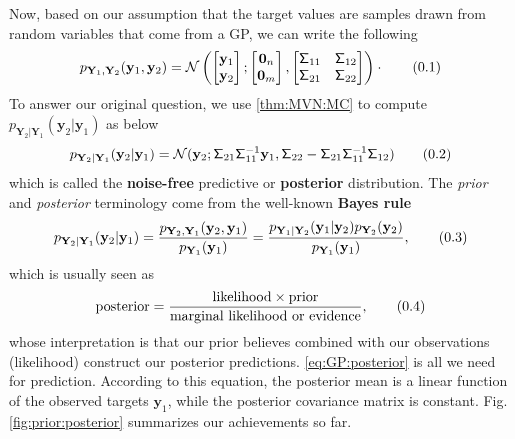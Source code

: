 \documentclass[10pt]{article}
\theoremstyle{definition}
\newcommand\eqnum{\addtocounter{equation}{1}\tag{\arabic{section}.\arabic{equation}}}
\begin{document}
Now, based on our assumption that the target values are samples drawn from random variables that come from a GP, we can write the following
\begin{equation*}
p_{\mathbf{Y}_{1}, \mathbf{Y}_{2}}(\mathbf{y}_{1}, \mathbf{y}_{2}) =
\mathcal{N} \left(
\begin{bmatrix}
\mathbf{y}_1 \\
\mathbf{y}_2
\end{bmatrix} ;
\begin{bmatrix}
\mathbf{0}_n \\
\mathbf{0}_m
\end{bmatrix} ,
\begin{bmatrix}
\mathsf{\Sigma}_{11} & \mathsf{\Sigma}_{12} \\
\mathsf{\Sigma}_{21} & \mathsf{\Sigma}_{22} 
\end{bmatrix}
\right) \cdot
\eqnum
\label{eq:GP:joint}
\end{equation*}
To answer our original question, we use \cref{thm:MVN:MC} to compute $p_{\mathbf{Y}_2|\mathbf{Y}_1}(\mathbf{y}_2|\mathbf{y}_1)$ as below
\begin{equation*}
p_{\mathbf{Y}_2|\mathbf{Y}_1}(\mathbf{y}_2|\mathbf{y}_1) = 
\mathcal{N}(\mathbf{y}_2;\mathsf{\Sigma}_{21}\mathsf{\Sigma}_{11}^{-1}\mathbf{y}_1, \mathsf{\Sigma}_{22} - 
\mathsf{\Sigma}_{21} \mathsf{\Sigma}_{11}^{-1} \mathsf{\Sigma}_{12})
\eqnum
\label{eq:GP:posterior}
\end{equation*}
which is called the \textbf{noise-free} predictive or \textbf{posterior} distribution.  The \textit{prior} and \textit{posterior} terminology come from the well-known \textbf{Bayes rule}
\begin{equation*}
p_{\mathbf{Y}_2|\mathbf{Y}_1}(\mathbf{y}_2|\mathbf{y}_1) =
\frac{p_{\mathbf{Y}_2,\mathbf{Y}_1}(\mathbf{y}_2,\mathbf{y}_1)}{p_{\mathbf{Y}_1}(\mathbf{y}_1)} = 
\frac{p_{\mathbf{Y}_1|\mathbf{Y}_2}(\mathbf{y}_1|\mathbf{y}_2)p_{\mathbf{Y}_2}(\mathbf{y}_2)}{p_{\mathbf{Y}_1}(\mathbf{y}_1)},
\eqnum
\end{equation*}
which is usually seen as
\begin{equation*}
\text{posterior} = \frac{\text{likelihood} \times \text{prior}}{\text{marginal likelihood or evidence}},
\eqnum
\end{equation*}
whose interpretation is that our prior believes combined with our observations (likelihood) construct our posterior predictions. \cref{eq:GP:posterior} is all we need for prediction. According to this equation, the posterior mean is a linear function of the observed targets $\mathbf{y}_1$, while the posterior covariance matrix is constant. Fig. \ref{fig:prior:posterior} summarizes our achievements so far.
\end{document}
